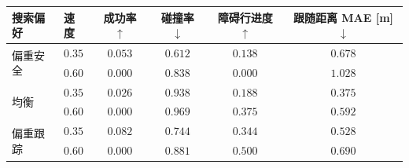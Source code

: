 \begin{tabular}{llcccc}
\toprule
搜索偏好 & 速度 & 成功率 $\uparrow$ & 碰撞率 $\downarrow$ &
障碍行进度 $\uparrow$ & 跟随距离 MAE [m] $\downarrow$ \\
\midrule
\multirow{2}{*}{偏重安全}
 & $0.35$ & $0.053$ & $0.612$ & $0.138$ & $0.678$ \\
 & $0.60$ & $0.000$ & $0.838$ & $0.000$ & $1.028$ \\
\multirow{2}{*}{均衡}
 & $0.35$ & $0.026$ & $0.938$ & $0.188$ & $0.375$ \\
 & $0.60$ & $0.000$ & $0.969$ & $0.375$ & $0.592$ \\
\multirow{2}{*}{偏重跟踪}
 & $0.35$ & $0.082$ & $0.744$ & $0.344$ & $0.528$ \\
 & $0.60$ & $0.000$ & $0.881$ & $0.500$ & $0.690$ \\
\bottomrule
\end{tabular}
